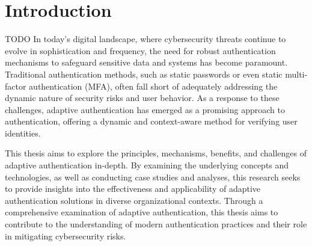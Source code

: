\documentclass[
  digital,     %
  oneside,     %
  nosansbold,  %
  nocolorbold, %
  lof,         %
  lot,         %
]{fithesis4}
\begin{document}
\chapter*{Introduction}

TODO
In today's digital landscape, where cybersecurity threats continue to evolve in sophistication and frequency, the need for robust authentication mechanisms to safeguard sensitive data and systems has become paramount.
Traditional authentication methods, such as static passwords or even static multi-factor authentication (MFA), often fall short of adequately addressing the dynamic nature of security risks and user behavior.
As a response to these challenges, adaptive authentication has emerged as a promising approach to authentication, offering a dynamic and context-aware method for verifying user identities.

This thesis aims to explore the principles, mechanisms, benefits, and challenges of adaptive authentication in-depth.
By examining the underlying concepts and technologies, as well as conducting case studies and analyses, this research seeks to provide insights into the effectiveness and applicability of adaptive authentication solutions in diverse organizational contexts.
Through a comprehensive examination of adaptive authentication, this thesis aims to contribute to the understanding of modern authentication practices and their role in mitigating cybersecurity risks.
\end{document}
